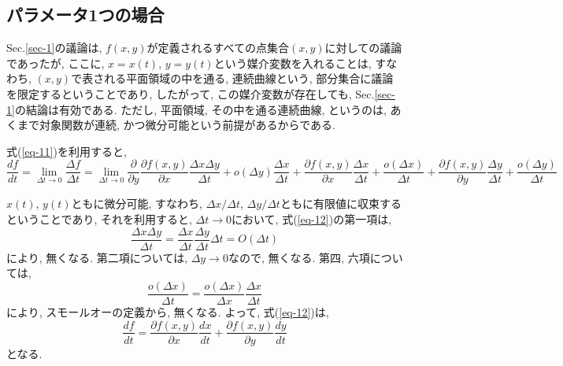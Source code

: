 \documentclass{jsarticle}
\begin{document}
\subsection{パラメータ1つの場合}
Sec.\ref{sec-1}の議論は, $f(x, y)$が定義されるすべての点集合$(x, y)$に対しての議論であったが, ここに, $x = x(t)$, $y = y(t)$という媒介変数を入れることは, すなわち, $(x, y)$で表される平面領域の中を通る, 連続曲線という, 部分集合に議論を限定するということであり, したがって, この媒介変数が存在しても, Sec.\ref{sec-1}の結論は有効である. 
ただし, 平面領域, その中を通る連続曲線, というのは, あくまで対象関数が連続, かつ微分可能という前提があるからである. 

式(\ref{eq-11})を利用すると, 
\begin{equation}\label{eq-12}
  \frac{d f}{d t}
  = \lim_{\Delta t \to 0}\frac{\Delta f}{\Delta t}
  = \lim_{\Delta t \to 0}\frac{\partial}{\partial y}\frac{\partial f(x, y)}{\partial x}\frac{\Delta x \Delta y}{\Delta t}
  + o(\Delta y)\frac{\Delta x}{\Delta t}
  + \frac{\partial f(x, y)}{\partial x}\frac{\Delta x}{\Delta t} 
  + \frac{o(\Delta x)}{\Delta t}
  + \frac{\partial f(x, y)}{\partial y}\frac{\Delta y}{\Delta t}
  + \frac{o(\Delta y)}{\Delta t}
\end{equation}

$x(t)$, $y(t)$ともに微分可能, すなわち, $\Delta x / \Delta t$, $\Delta y / \Delta t$ともに有限値に収束するということであり, それを利用すると, $\Delta t \to 0$において, 
式(\ref{eq-12})の第一項は, 
\[
  \frac{\Delta x \Delta y}{\Delta t} = \frac{\Delta x}{\Delta t} \frac{\Delta y}{\Delta t} \Delta t = O(\Delta t)
\]
により, 無くなる. 
第二項については, $\Delta y \to 0$なので, 無くなる. 
第四, 六項については, 
\[
  \frac{o(\Delta x)}{\Delta t} = \frac{o(\Delta x)}{\Delta x}\frac{\Delta x}{\Delta t}
\]
により, スモールオーの定義から, 無くなる. 
よって, 式(\ref{eq-12})は, 
\begin{equation}
  \frac{d f}{d t} = \frac{\partial f(x, y)}{\partial x}\frac{d x}{d t} + \frac{\partial f(x, y)}{\partial y}\frac{d y}{d t}
\end{equation}
となる. 
\end{document}
